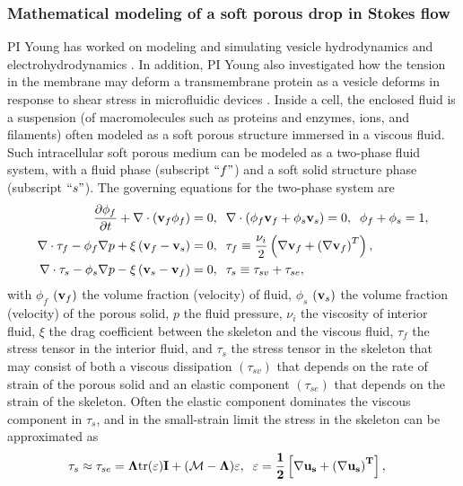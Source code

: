 \documentclass[11pt]{article}
\begin{document}
\subsubsection{Mathematical modeling of a soft porous drop in Stokes flow \label{subsubsec:math_modeling}}
PI Young has worked on modeling and simulating vesicle hydrodynamics \cite{Veerapaneni2011_PRL,Vlahovska2011_JFM} 
and electrohydrodynamics \cite{HuLai2016_JCP,Nganguia2013_PRE}.
In addition, PI Young also investigated how the tension in the membrane may deform a transmembrane protein 
as a vesicle deforms in response to shear stress in microfluidic devices \cite{Pak2015_PNAS,Peng2016_AMS}.
Inside a cell, the enclosed fluid is a suspension (of macromolecules such as proteins and enzymes, ions, and filaments)
often modeled as a soft porous structure immersed in a viscous fluid.
Such intracellular soft porous medium can be modeled as a two-phase fluid system, with a fluid phase (subscript $``f"$)
and a soft solid structure phase (subscript $``s"$).
The governing equations for the two-phase system are
\begin{align}
\label{eq:geq1}
\frac{\partial \phi_f}{\partial t} + \nabla \cdot \left({\bf v}_f \phi_f\right) &= 0,\;\; \nabla \cdot \left(\phi_f {\bf v}_f + \phi_s {\bf v}_s \right) =0,\;\;\phi_f + \phi_s = 1,\\
\label{eq:geq2}
\nabla \cdot {\tau}_f -\phi_f \nabla p +\xi\left({\bf v}_f - {\bf v}_s\right) &=0,\;\; \tau_f\equiv \frac{\nu_i}{2}\left(\nabla {\bf v}_f + \left(\nabla{\bf v}_f\right)^T\right), \\
\label{eq:geq3}
\nabla \cdot {\tau}_s-\phi_s \nabla p -\xi \left({\bf v}_s - {\bf v}_f\right) &=0,\;\; \tau_s\equiv \tau_{sv}+\tau_{se},
\end{align}
with $\phi_f$ $({\bf v}_f)$ the volume fraction (velocity) of fluid, $\phi_s$  $({\bf v}_s)$ the volume fraction (velocity) of 
the porous solid, $p$ the fluid pressure,
$\nu_i$ the viscosity of interior fluid,
$\xi$ the drag coefficient between the skeleton and the viscous fluid, 
$\tau_f$  the stress tensor in the interior fluid, and $\tau_s$ the stress tensor in the skeleton that may consist of
both a viscous dissipation $(\tau_{sv})$ that depends on the rate of strain of the porous solid 
and an elastic component $(\tau_{se})$ that depends on the strain of the skeleton.
Often the elastic component dominates the viscous component in $\tau_s$,  
and in the small-strain limit the stress in the skeleton can be approximated as
\begin{align}
\tau_s &\approx \tau_{se} = \bf{\Lambda}\mbox{tr}(\bf{\varepsilon}) \bf{I} + ({\cal M}-\Lambda) \bf{\varepsilon},\;\; 
{\bf \varepsilon} = \frac{1}{2}\left[\nabla {\bf u}_s + \left(\nabla {\bf u}_s\right)^T\right],
\end{align}
\end{document}
